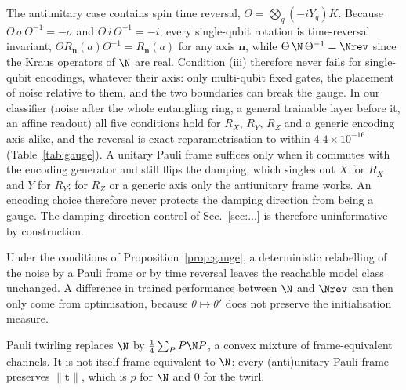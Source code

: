 The antiunitary case contains spin time reversal, $\Theta=\bigotimes_q(-iY_q)K$. Because
$\Theta\,\sigma\,\Theta^{-1}=-\sigma$ and $\Theta\,i\,\Theta^{-1}=-i$, every single-qubit
rotation is time-reversal invariant, $\Theta R_{\mathbf n}(a)\Theta^{-1}=R_{\mathbf n}(a)$ for
any axis $\mathbf n$, while $\Theta\,\N\,\Theta^{-1}=\Nrev$ since the Kraus operators of $\N$
are real. Condition (iii) therefore never fails for single-qubit encodings, whatever their
axis: only multi-qubit fixed gates, the placement of noise relative to them, and the two
boundaries can break the gauge. In our classifier (noise after the whole entangling ring,
a general trainable layer before it, an affine readout) all five conditions hold for
$R_X$, $R_Y$, $R_Z$ and a generic encoding axis alike, and the reversal is exact
reparametrisation to within $4.4\times10^{-16}$ (Table~\ref{tab:gauge}). A unitary Pauli frame suffices only when it
commutes with the encoding generator and still flips the damping, which singles out $X$ for
$R_X$ and $Y$ for $R_Y$; for $R_Z$ or a generic axis only the antiunitary frame works. An
encoding choice therefore never protects the damping direction from being a gauge. The damping-direction control of
Sec.~\ref{sec:...} is therefore uninformative by construction.

\begin{corollary}\label{cor:det}
Under the conditions of Proposition~\ref{prop:gauge}, a deterministic relabelling of the
noise by a Pauli frame or by time reversal leaves the reachable model class unchanged. A
difference in trained performance between $\N$ and $\Nrev$ can then only come from
optimisation, because $\theta\mapsto\theta'$ does not preserve the initialisation measure.
\end{corollary}

\begin{corollary}\label{cor:rand}
Pauli twirling replaces $\N$ by $\tfrac14\sum_P P\N P$, a convex mixture of
frame-equivalent channels. It is not itself frame-equivalent to $\N$: every (anti)unitary
Pauli frame preserves $\lVert\mathbf t\rVert$, which is $p$ for $\N$ and $0$ for the twirl.
\end{corollary}

